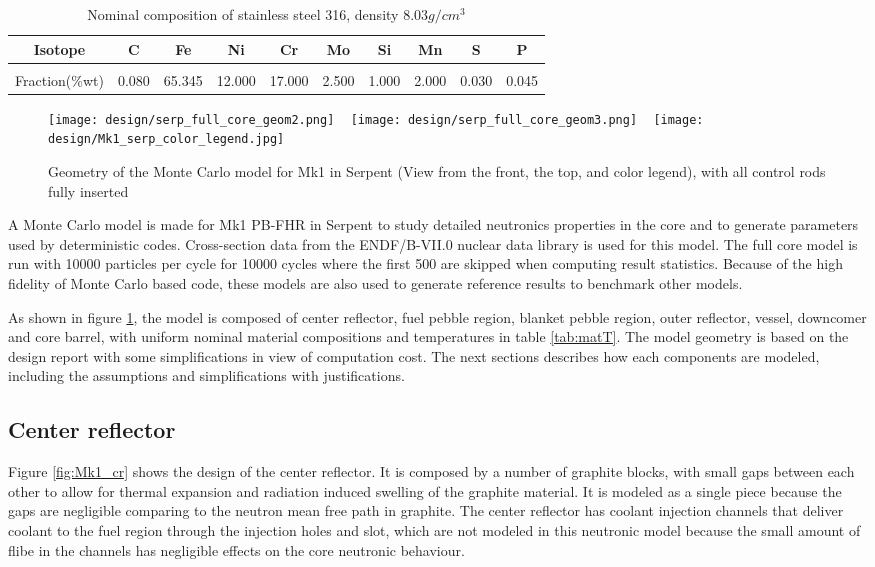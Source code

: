 \documentclass{elsarticle}
\begin{document}
\begin{table}
  \centering
  \begin{tabular}{cccccccccc}
    Isotope&C&Fe&Ni&Cr&Mo&Si&Mn&S&P\\
    \hline\\
    Fraction(\%wt)&0.080&65.345&12.000&17.000&2.500&1.000&2.000&0.030&0.045
  \end{tabular}
  \caption{Nominal composition of stainless steel 316, density 8.03$g/cm^3$}
  \label{tab:ss316}
\end{table}

\begin{figure}
  \centering
    \texttt{[image: design/serp\_full\_core\_geom2.png]}
    ~
    \texttt{[image: design/serp\_full\_core\_geom3.png]}
    ~
    \texttt{[image: design/Mk1\_serp\_color\_legend.jpg]}
  \caption{Geometry of the Monte Carlo model for Mk1 in Serpent (View from the front, the top, and color legend), with all control rods fully inserted}
  \label{fig:serp_Mk1}
\end{figure}

A Monte Carlo model is made for Mk1 PB-FHR in Serpent \cite{Serpent2015} to study detailed neutronics properties in the core and to generate parameters used by deterministic codes. Cross-section data from the ENDF/B-VII.0 nuclear data library is used for this model. The full core model is run with 10000 particles per cycle for 10000 cycles where the first 500 are skipped when computing result statistics. Because of the high fidelity of Monte Carlo based code, these models are also used to generate reference results to benchmark other models. 

As shown in figure \ref{fig:serp_Mk1}, the model is composed of center reflector, fuel pebble region, blanket pebble region, outer reflector, vessel, downcomer and core barrel, with uniform nominal material compositions and temperatures in table \ref{tab:matT}.
The model geometry is based on the design report \cite{Andreades2016} with some simplifications in view of computation cost. 
The next sections describes how each components are modeled, including the assumptions and simplifications with justifications.





\subsection{Center reflector}

Figure \ref{fig:Mk1_cr} shows the design of the center reflector. It is composed by a number of graphite blocks, with small gaps between each other to allow for thermal expansion and radiation induced swelling of the graphite material. It is modeled as a single piece because the gaps are negligible comparing to the neutron mean free path in graphite. The center reflector has coolant injection channels that deliver coolant to the fuel region through the injection holes and slot, which are not modeled in this neutronic model because the small amount of flibe in the channels has negligible effects on the core neutronic behaviour.
\end{document}
